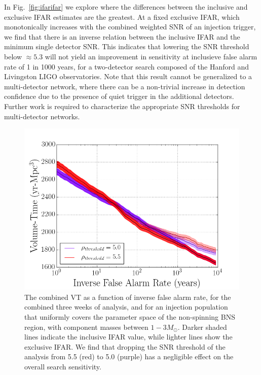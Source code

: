 In Fig.~\ref{fig:ifarifar} we explore where the differences between the inclusive and exclusive IFAR estimates are the greatest. At a fixed exclusive IFAR, which monotonically increases with the combined weighted SNR of an injection trigger, we find that there is an inverse relation between the inclusive IFAR and the minimum single detector SNR. This indicates that lowering the SNR threshold below $\approx 5.3$ will not yield an improvement in sensitivity at inclusieve false alarm rate of 1 in 1000 years, for a two-detector search composed of the Hanford and Livingston LIGO observatories. Note that this result cannot be generalized to a multi-detector network, where there can be a non-trivial increase in detection confidence due to the presence of quiet trigger in the additional detectors. Further work is required to characterize the appropriate SNR thresholds for multi-detector networks.



\begin{figure}
\centering
\includegraphics[width=1.0\textwidth]{papers/bns_o1_dev/figures/snr_combined.png}
\caption{\label{fig:snrthreshold} 
The combined VT as a function of inverse false alarm rate, for the combined three weeks of analysis, and for an injection population that uniformly covers the parameter space of the non-spinning BNS region, with component masses between $1- 3M_\odot$. Darker shaded lines indicate the inclusive IFAR value, while lighter lines show the exclusive IFAR. We find that dropping the SNR threshold of the analysis from 5.5 (red) to 5.0 (purple) has a negligible effect on the overall search sensitivity.
}
\end{figure}

